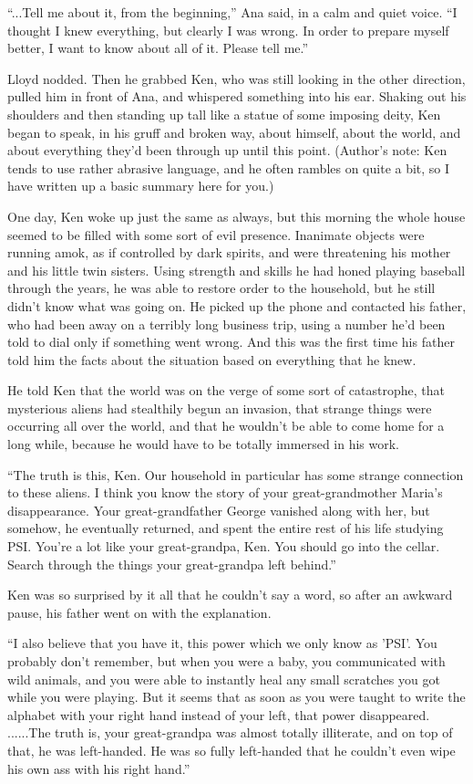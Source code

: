 \documentclass[
]{article}
\begin{document}
``...Tell me about it, from the beginning,'' Ana said, in a calm and
quiet voice. ``I thought I knew everything, but clearly I was wrong. In
order to prepare myself better, I want to know about all of it. Please
tell me.''

Lloyd nodded. Then he grabbed Ken, who was still looking in the other
direction, pulled him in front of Ana, and whispered something into his
ear. Shaking out his shoulders and then standing up tall like a statue
of some imposing deity, Ken began to speak, in his gruff and broken way,
about himself, about the world, and about everything they'd been through
up until this point. (Author's note: Ken tends to use rather abrasive
language, and he often rambles on quite a bit, so I have written up a
basic summary here for you.)

One day, Ken woke up just the same as always, but this morning the whole
house seemed to be filled with some sort of evil presence. Inanimate
objects were running amok, as if controlled by dark spirits, and were
threatening his mother and his little twin sisters. Using strength and
skills he had honed playing baseball through the years, he was able to
restore order to the household, but he still didn't know what was going
on. He picked up the phone and contacted his father, who had been away
on a terribly long business trip, using a number he'd been told to dial
only if something went wrong. And this was the first time his father
told him the facts about the situation based on everything that he knew.

He told Ken that the world was on the verge of some sort of catastrophe,
that mysterious aliens had stealthily begun an invasion, that strange
things were occurring all over the world, and that he wouldn't be able
to come home for a long while, because he would have to be totally
immersed in his work.

``The truth is this, Ken. Our household in particular has some strange
connection to these aliens. I think you know the story of your
great-grandmother Maria's disappearance. Your great-grandfather George
vanished along with her, but somehow, he eventually returned, and spent
the entire rest of his life studying PSI. You're a lot like your
great-grandpa, Ken. You should go into the cellar. Search through the
things your great-grandpa left behind.''

Ken was so surprised by it all that he couldn't say a word, so after an
awkward pause, his father went on with the explanation.

``I also believe that you have it, this power which we only know as
'PSI'. You probably don't remember, but when you were a baby, you
communicated with wild animals, and you were able to instantly heal any
small scratches you got while you were playing. But it seems that as
soon as you were taught to write the alphabet with your right hand
instead of your left, that power disappeared. ......The truth is, your
great-grandpa was almost totally illiterate, and on top of that, he was
left-handed. He was so fully left-handed that he couldn't even wipe his
own ass with his right hand.''
\end{document}
